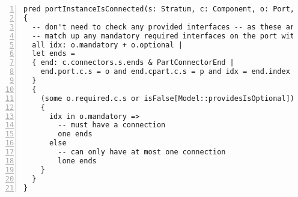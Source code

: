 \begin{lstlisting}[caption={wellformed\_components.als}, numbers=left]
pred portInstanceIsConnected(s: Stratum, c: Component, o: Port, p: Part)
{
  -- don't need to check any provided interfaces -- as these are always optional
  -- match up any mandatory required interfaces on the port with a single connector
  all idx: o.mandatory + o.optional |
  let ends =
  { end: c.connectors.s.ends & PartConnectorEnd |
    end.port.c.s = o and end.cpart.c.s = p and idx = end.index
  }
  {
    (some o.required.c.s or isFalse[Model::providesIsOptional]) =>
    {
      idx in o.mandatory =>
        -- must have a connection
        one ends
      else
        -- can only have at most one connection
        lone ends
    }
  }
}

\end{lstlisting}